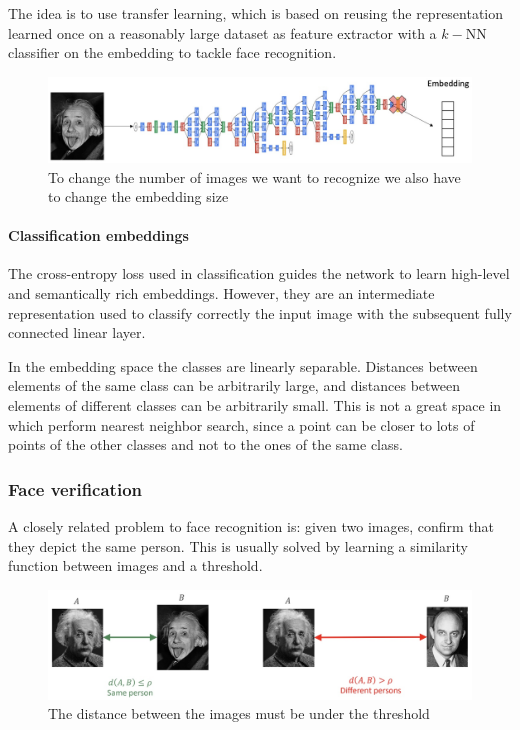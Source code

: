 The idea is to use transfer learning, which is based on reusing the representation learned once on a reasonably large dataset as feature extractor with a $k-$NN classifier on the embedding to tackle face recognition.

\begin{figure}[htbp]
  \centering
  \includegraphics[width=0.7\linewidth]{./img/face_recognition.jpg}
  \caption{To change the number of images we want to recognize we also have to change the embedding size}
\end{figure}

\paragraph{Classification embeddings}
The cross-entropy loss used in classification guides the network to learn high-level and semantically rich embeddings.
However, they are an intermediate representation used to classify correctly the input image with the subsequent fully connected linear layer.

In the embedding space the classes are linearly separable.
Distances between elements of the same class can be arbitrarily large, and distances between elements of different classes can be arbitrarily small.
This is not a great space in which perform nearest neighbor search, since a point can be closer to lots of points of the other classes and not to the ones of the same class.

\subsubsection{Face verification}
A closely related problem to face recognition is: given two images, confirm that they depict the same person.
This is usually solved by learning a similarity function between images and a threshold.

\begin{figure}[htbp]
  \centering
  \includegraphics[width=0.7\linewidth]{./img/face_verification.jpg}
  \caption{The distance between the images must be under the threshold}
\end{figure}

